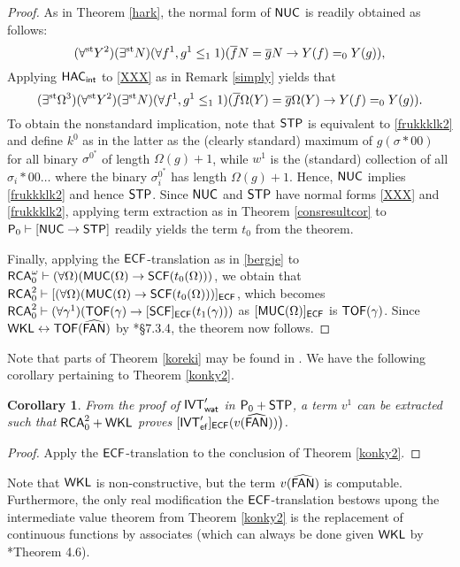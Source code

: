 \documentclass[reqno]{amsart}
\newtheorem{cor}[thm]{Corollary}
\newcommand\be{\begin{equation}}
\newcommand\ee{\end{equation}}
\def\STP{\textup{\textsf{STP}}}
\def\RCA{\textup{\textsf{RCA}}}
\def\RCAo{\textup{\textsf{RCA}}_{0}^{\omega}}
\def\ef{\textup{\textsf{ef}}}
\def\WKL{\textup{\textsf{WKL}}}
\def\IVT{\textup{IVT}}
\def\IVT{\textup{\textsf{IVT}}}
\def\P{\textup{\textsf{P}}}
\def\FAN{\textup{\textsf{FAN}}}
\def\MUC{\textup{\textsf{MUC}}}
\def\st{\textup{st}}
\def\asa{\leftrightarrow}
\def\di{\rightarrow}
\def\eps{\varepsilon}
\def\IVT{\textup{\textsf{IVT}}}
\def\NUC{\textup{\textsf{NUC}}}
\def\TOF{\textup{\textsf{TOF}}}
\def\ECF{\textup{\textsf{ECF}}}
\def\wat{\textup{\textsf{wat}}}
\def\SCF{\textup{\textsf{SCF}}}
\def\HAC{\textup{\textsf{HAC}}}
\def\INT{\textup{\textsf{int}}}
\numberwithin{equation}{section}
\numberwithin{thm}{section}
\begin{document}
\begin{proof}
As in Theorem \ref{hark}, the normal form of $\NUC$ is readily obtained as follows:  
\be\label{XXX}
(\forall^{\st}Y^{2})(\exists^{\st}N)(\forall f^{1}, g^{1}\leq_{1}1)(\overline{f}N=\overline{g}N\di Y(f)=_{0}Y(g)), 
\ee
Applying $\HAC_{\INT}$ to \eqref{XXX} as in Remark \ref{simply} yields that    
\[
(\exists^{\st} \Omega^{3})(\forall^{\st}Y^{2})(\exists^{\st}N)(\forall f^{1}, g^{1}\leq_{1}1)(\overline{f}\Omega(Y)=\overline{g}\Omega(Y)\di Y(f)=_{0}Y(g)).
\]
To obtain the nonstandard implication, note that $\STP$ is equivalent to \eqref{frukkklk2} and define $ k^{0}$ as in the latter as the (clearly standard) maximum of $g(\sigma*00)$ for all binary $\sigma^{0^{*}}$ of length $\Omega(g)+1$, while $w^{1}$ is the (standard) collection of all $\sigma_{i}*00\dots$ where the binary $\sigma_{i}^{0^{*}}$ has length $\Omega(g)+1$.  Hence, $\NUC$ implies \eqref{frukkklk2} and hence $\STP$.  
Since $\NUC$ and $\STP$ have normal forms \eqref{XXX} and \eqref{frukkklk2}, applying term extraction as in Theorem \ref{consresultcor} to $\P_{0}\vdash [\NUC\di\STP]$ readily yields the term $t_{0}$ from the theorem.  
  
\medskip

Finally, applying the $\ECF$-translation as in \eqref{bergje} to $\RCAo\vdash (\forall \Omega)(\MUC(\Omega)\di \SCF(t_{0}(\Omega)))$, we obtain 
that $\RCA_{0}^{2}\vdash [ (\forall \Omega)(\MUC(\Omega)\di \SCF(t_{0}(\Omega)))]_{\ECF} $, which becomes 
$\RCA_{0}^{2}\vdash (\forall \gamma^{1})(\TOF(\gamma)\di [\SCF]_{\ECF}(t_{1}(\gamma)))$ as $[\MUC(\Omega)]_{\ECF}$ is $\TOF(\gamma)$.
Since $\WKL\asa \TOF(\widehat{\FAN})$ by \cite{longmann}*{\S7.3.4}, the theorem now follows.  
\end{proof}
Note that parts of Theorem \ref{koreki} may be found in \cite{samGH, dagsam}.  We have the following corollary pertaining to Theorem \ref{konky2}.
\begin{cor}\label{klike}
From the proof of $\IVT_{\textsf{\wat}}'$ in $\P_{0}+\STP$, a term $v^{1}$ can be extracted such that $\RCA_{0}^{2}+\WKL$ proves 
$[\IVT_{\ef}']_{\ECF}(v(\widehat{\FAN}))\big)$.
\end{cor}
\begin{proof}
Apply the $\ECF$-translation to the conclusion of Theorem \ref{konky2}.
\end{proof}
Note that $\WKL$ is non-constructive, but the term $v(\widehat{\FAN})$ is computable.  
Furthermore, the only real modification the $\ECF$-translation bestows upong the intermediate value theorem from Theorem \ref{konky2} is the replacement of continuous functions by associates (which can always be done given $\WKL$ by \cite{kohlenbach4}*{Theorem 4.6}).  
\end{document}
